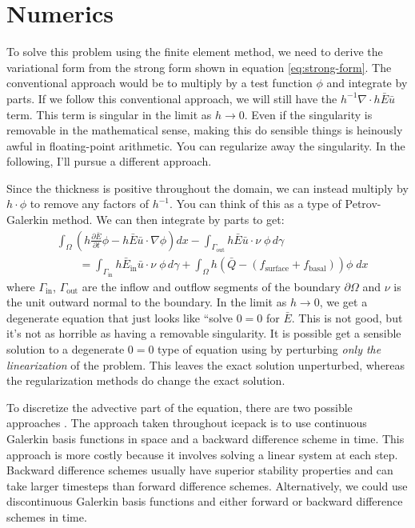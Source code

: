 \documentclass{article}
\theoremstyle{definition}
\theoremstyle{plain}
\begin{document}
\section{Numerics}

To solve this problem using the finite element method, we need to derive the variational form from the strong form shown in equation \eqref{eq:strong-form}.
The conventional approach would be to multiply by a test function $\phi$ and integrate by parts.
If we follow this conventional approach, we will still have the $h^{-1}\nabla\cdot h\bar E\bar u$ term.
This term is singular in the limit as $h \to 0$.
Even if the singularity is removable in the mathematical sense, making this do sensible things is heinously awful in floating-point arithmetic.
You can regularize away the singularity.
In the following, I'll pursue a different approach.

Since the thickness is positive throughout the domain, we can instead multiply by $h\cdot\phi$ to remove any factors of $h^{-1}$.
You can think of this as a type of Petrov-Galerkin method.
We can then integrate by parts to get:
\begin{align}
    & \int_\Omega\left(h\frac{\partial\bar E}{\partial t}\phi - h\bar E\bar u\cdot\nabla\phi\right)dx - \int_{\Gamma_{\text{out}}}h\bar E\bar u\cdot\nu\;\phi\,d\gamma \\
    & \qquad = \int_{\Gamma_{\text{in}}}h\bar E_{\text{in}}\bar u\cdot\nu\;\phi\,d\gamma + \int_\Omega h\left(\bar Q - (f_{\text{surface}} + f_{\text{basal}})\right)\phi\; dx
\end{align}
where $\Gamma_{\text{in}}$, $\Gamma_{\text{out}}$ are the inflow and outflow segments of the boundary $\partial\Omega$ and $\nu$ is the unit outward normal to the boundary.
In the limit as $h \to 0$, we get a degenerate equation that just looks like ``solve $0 = 0$ for $\bar E$.
This is not good, but it's not as horrible as having a removable singularity.
It is possible get a sensible solution to a degenerate $0 = 0$ type of equation using by perturbing \emph{only the linearization} of the problem.
This leaves the exact solution unperturbed, whereas the regularization methods do change the exact solution.

To discretize the advective part of the equation, there are two possible approaches \citep{donea2003finite}.
The approach taken throughout icepack is to use continuous Galerkin basis functions in space and a backward difference scheme in time.
This approach is more costly because it involves solving a linear system at each step.
Backward difference schemes usually have superior stability properties and can take larger timesteps than forward difference schemes.
Alternatively, we could use discontinuous Galerkin basis functions and either forward or backward difference schemes in time.
\end{document}
